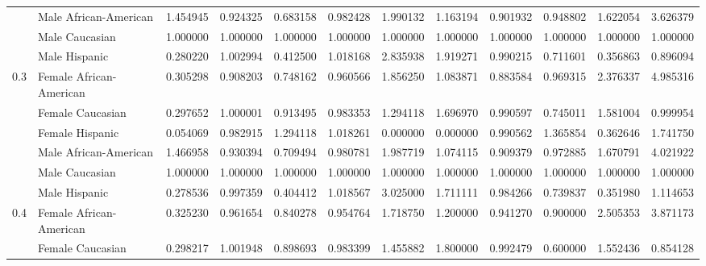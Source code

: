\begin{tabular}{llrrrrrrrrrr}
    & Male African-American &       1.454945 &       0.924325 &       0.683158 &             0.982428 &       1.990132 &       1.163194 &         0.901932 &       0.948802 &       1.622054 &       3.626379 \\
    & Male Caucasian &       1.000000 &       1.000000 &       1.000000 &             1.000000 &       1.000000 &       1.000000 &         1.000000 &       1.000000 &       1.000000 &       1.000000 \\
    & Male Hispanic &       0.280220 &       1.002994 &       0.412500 &             1.018168 &       2.835938 &       1.919271 &         0.990215 &       0.711601 &       0.356863 &       0.896094 \\
0.3 & Female African-American &       0.305298 &       0.908203 &       0.748162 &             0.960566 &       1.856250 &       1.083871 &         0.883584 &       0.969315 &       2.376337 &       4.985316 \\
    & Female Caucasian &       0.297652 &       1.000001 &       0.913495 &             0.983353 &       1.294118 &       1.696970 &         0.990597 &       0.745011 &       1.581004 &       0.999954 \\
    & Female Hispanic &       0.054069 &       0.982915 &       1.294118 &             1.018261 &       0.000000 &       0.000000 &         0.990562 &       1.365854 &       0.362646 &       1.741750 \\
    & Male African-American &       1.466958 &       0.930394 &       0.709494 &             0.980781 &       1.987719 &       1.074115 &         0.909379 &       0.972885 &       1.670791 &       4.021922 \\
    & Male Caucasian &       1.000000 &       1.000000 &       1.000000 &             1.000000 &       1.000000 &       1.000000 &         1.000000 &       1.000000 &       1.000000 &       1.000000 \\
    & Male Hispanic &       0.278536 &       0.997359 &       0.404412 &             1.018567 &       3.025000 &       1.711111 &         0.984266 &       0.739837 &       0.351980 &       1.114653 \\
0.4 & Female African-American &       0.325230 &       0.961654 &       0.840278 &             0.954764 &       1.718750 &       1.200000 &         0.941270 &       0.900000 &       2.505353 &       3.871173 \\
    & Female Caucasian &       0.298217 &       1.001948 &       0.898693 &             0.983399 &       1.455882 &       1.800000 &         0.992479 &       0.600000 &       1.552436 &       0.854128 \\

\end{tabular}
